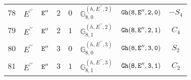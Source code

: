 \documentclass[fleqn,8pt]{jsarticle}
\begin{document}
\begin{table}[ht!]
\begin{center}
\begin{tabular}{cccccccc}
$ 78 $ & $ E^{\prime\prime} $ & $ {\tt E''} $ & $ 2 $ & $ 0 $ & $ \mathbb{G}_{8,0}^{(h,E^{\prime\prime},2)} $ & $ {\tt Gh(8,E'',2,0)} $ & $ - S_{4} $ \\
$ 79 $ & $ E^{\prime\prime} $ & $ {\tt E''} $ & $ 2 $ & $ 1 $ & $ \mathbb{G}_{8,1}^{(h,E^{\prime\prime},2)} $ & $ {\tt Gh(8,E'',2,1)} $ & $ C_{4} $ \\
$ 80 $ & $ E^{\prime\prime} $ & $ {\tt E''} $ & $ 3 $ & $ 0 $ & $ \mathbb{G}_{8,0}^{(h,E^{\prime\prime},3)} $ & $ {\tt Gh(8,E'',3,0)} $ & $ S_{2} $ \\
$ 81 $ & $ E^{\prime\prime} $ & $ {\tt E''} $ & $ 3 $ & $ 1 $ & $ \mathbb{G}_{8,1}^{(h,E^{\prime\prime},3)} $ & $ {\tt Gh(8,E'',3,1)} $ & $ C_{2} $ \\
 \hline \hline
\end{tabular}
\end{center}
\end{table}
\end{document}
